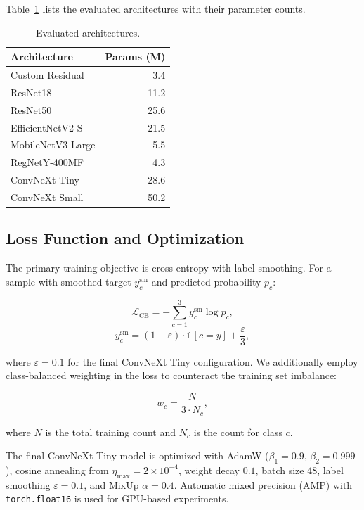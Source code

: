 \documentclass[10pt,twocolumn,letterpaper]{article}
\begin{document}
Table~\ref{tab:arch} lists the evaluated architectures with their parameter counts.

\begin{table}[h]
\small
\centering
\caption{Evaluated architectures.}
\label{tab:arch}
\begin{tabular}{lr}
\toprule
Architecture & Params (M) \\
\midrule
Custom Residual   & 3.4 \\
ResNet18          & 11.2 \\
ResNet50          & 25.6 \\
EfficientNetV2-S  & 21.5 \\
MobileNetV3-Large & 5.5 \\
RegNetY-400MF     & 4.3 \\
ConvNeXt Tiny     & 28.6 \\
ConvNeXt Small    & 50.2 \\
\bottomrule
\end{tabular}
\end{table}

\subsection{Loss Function and Optimization}

The primary training objective is cross-entropy with label smoothing. For a sample with smoothed target $y^{\text{sm}}_c$ and predicted probability $p_c$:

\begin{equation}
    \mathcal{L}_{\text{CE}} = -\sum_{c=1}^{3} y^{\text{sm}}_c \log p_c,
\end{equation}
\begin{equation}
    y^{\text{sm}}_c = (1-\varepsilon) \cdot \mathbb{1}[c=y] + \frac{\varepsilon}{3},
\end{equation}

where $\varepsilon = 0.1$ for the final ConvNeXt Tiny configuration. We additionally employ class-balanced weighting in the loss to counteract the training set imbalance:

\begin{equation}
    w_c = \frac{N}{3 \cdot N_c},
\end{equation}

where $N$ is the total training count and $N_c$ is the count for class $c$.

The final ConvNeXt Tiny model is optimized with AdamW ($\beta_1=0.9$, $\beta_2=0.999$), cosine annealing from $\eta_{\max}=2\times10^{-4}$, weight decay $0.1$, batch size 48, label smoothing $\varepsilon=0.1$, and MixUp $\alpha=0.4$. Automatic mixed precision (AMP) with \texttt{torch.float16} is used for GPU-based experiments.
\end{document}
